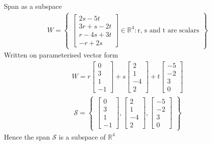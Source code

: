 \begin{example}{Span as a subspace}
\begin{align*}
    W = \begin{Bmatrix}
    \begin{bmatrix}
    2s-5t\\3r+s-2t\\r-4s+3t\\-r+2s
    \end{bmatrix}
        \in \mathbb{R}^4:\text{r, s and t are scalars}
    \end{Bmatrix}
\end{align*}
Written on parameterised vector form
\begin{align*}
    W =
    r \begin{bmatrix}
        0 \\ 3 \\1 \\ -1
    \end{bmatrix}
    +s\begin{bmatrix}
        2 \\ 1 \\ -4 \\ 2
    \end{bmatrix}
    +t\begin{bmatrix}
        -5 \\ -2 \\ 3 \\ 0
    \end{bmatrix}
\end{align*}
\begin{align*}
    \mathcal{S}=
    \begin{Bmatrix}
    \begin{bmatrix}
        0 \\ 3 \\1 \\ -1
    \end{bmatrix}, 
    \begin{bmatrix}
        2 \\ 1 \\ -4 \\ 2
    \end{bmatrix},
    \begin{bmatrix}
        -5 \\ -2 \\ 3 \\ 0
    \end{bmatrix}
    \end{Bmatrix}
\end{align*}
Hence the span $\mathcal{S}$ is a subspace of $\mathbb{R}^4$
\end{example}
